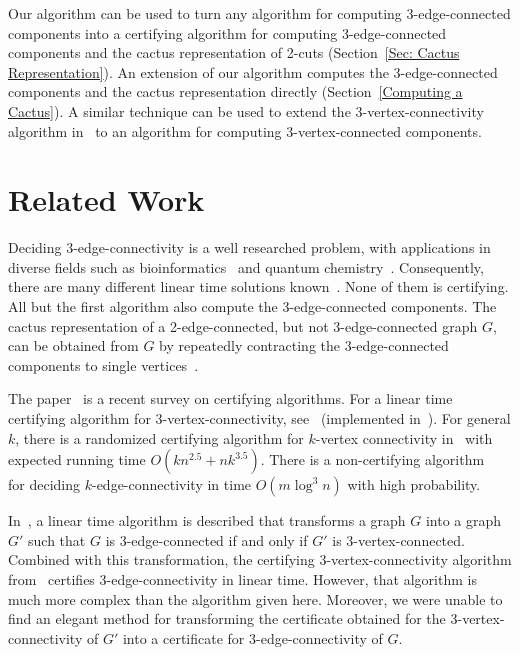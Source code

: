 \documentclass[paper=a4]{scrartcl}
\begin{document}
Our algorithm can be used to turn any algorithm for computing 3-edge-connected components into a certifying algorithm for computing 3-edge-connected components and the cactus representation of 2-cuts (Section~\ref{Sec: Cactus Representation}). An extension of our algorithm computes the 3-edge-connected components and the cactus representation directly (Section~\ref{Computing a Cactus}).  A similar technique can be used to extend the 3-vertex-connectivity algorithm in~\cite{Schmidt2013} to an algorithm for computing 3-vertex-connected components.

\section{Related Work}
Deciding $3$-edge-connectivity is a well researched problem, with applications in diverse fields such as bioinformatics~\cite{dehne2006cluster} and quantum chemistry~\cite{corcoran2006perfect}. Consequently, there are many different linear time solutions known~\cite{Galil1991,Nagamochi1992a,Taoka1992,Tsin2007,Tsin2009,Nagamochi-Ibaraki-Book}. None of them is certifying. All but the first algorithm also compute the 3-edge-connected components. The cactus representation of a 2-edge-connected, but not 3-edge-connected graph $G$, can be obtained from $G$ by repeatedly contracting the 3-edge-connected components to single vertices~\cite{Nagamochi-Ibaraki-Book}.

The paper~\cite{McConnell2011} is a recent survey on certifying algorithms. For a linear time certifying algorithm for 3-vertex-connectivity, see~\cite{Schmidt2013} (implemented in~\cite{Neumann2011}). For general $k$, there is a randomized certifying algorithm for $k$-vertex connectivity in~\cite{Linial1988} with expected running time $O(kn^{2.5} + nk^{3.5})$. There is a non-certifying algorithm~\cite{Karger2000} for deciding $k$-edge-connectivity in time $O(m \log^3{n})$ with high probability.

In~\cite{Galil1991}, a linear time algorithm is described that transforms a graph $G$ into a graph $G'$ such that $G$ is 3-edge-connected if and only if $G'$ is 3-vertex-connected. Combined with this transformation, the certifying 3-vertex-connectivity algorithm from~\cite{Schmidt2013} certifies 3-edge-connectivity in linear time. However, that algorithm is much more complex than the algorithm given here. Moreover, we were unable to find an elegant method for transforming the certificate obtained for the 3-vertex-connectivity of $G'$ into a certificate for 3-edge-connectivity of $G$.
\end{document}
